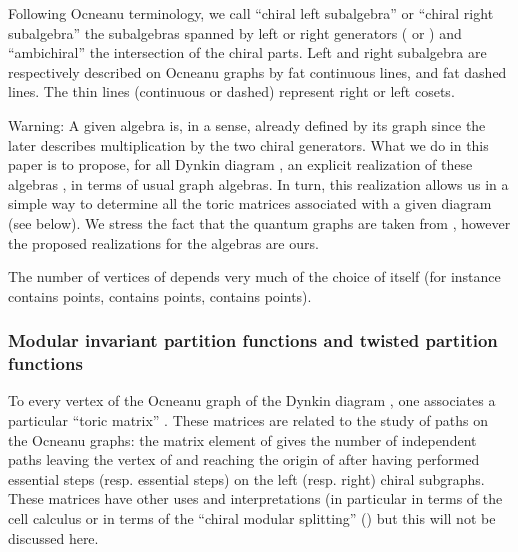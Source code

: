 \documentclass[a4paper,11pt]{article}
\def \otimesdot {\stackrel{\cdot}{\otimes}}
\begin{document}
Following Ocneanu terminology, we call ``chiral left subalgebra'' or ``chiral
right subalgebra'' the subalgebras spanned by left or right generators (\coordHE{} or \coordHE{})
       and ``ambichiral'' the intersection of the chiral parts. Left and
       right subalgebra are respectively described on Ocneanu graphs by
fat continuous lines,
       and fat dashed lines. The thin lines (continuous or dashed) represent
       right or left cosets.

       \smallskip

       Warning:  A given algebra  \coordHE{} is, in a
sense, already defined
       by its graph \coordHE{} since the later describes multiplication by
       the two chiral generators. What we do in this paper is to
propose, for all Dynkin diagram
       \coordHE{}, an explicit  realization of these algebras \coordHE{}, in terms of usual graph algebras. In turn,
       this realization allows us in a simple way to determine all the
toric matrices
       associated with a given diagram (see below).
         We stress the fact that the quantum graphs \coordHE{} are taken from
       \cite{Ocneanu:paths}, however the proposed realizations for the
       algebras \coordHE{} are ours.

       \smallskip
       
The number of vertices of
\coordHE{} depends very much of the choice of \coordHE{} itself (for instance
\coordHE{} contains \coordHE{}
points, \coordHE{} contains \coordHE{} points, \coordHE{} contains \coordHE{}
points).

\subsubsection{Modular invariant partition functions and twisted
partition functions}

To every vertex \coordHE{} of the Ocneanu graph \coordHE{} of the Dynkin diagram \coordHE{}, one
associates a particular ``toric matrix'' \coordHE{}. 
These matrices are related to the study of paths on the Ocneanu
graphs: the matrix element \coordHE{} of  \coordHE{} gives the 
number of independent  paths leaving the vertex \coordHE{} of 
\coordHE{} and reaching the origin \myHighlight{$0 \otimesdot 0$}\coordHE{} of \coordHE{} after 
having performed \coordHE{} essential steps 
(resp. \coordHE{} essential steps) on the left (resp. right) chiral subgraphs.
These matrices have other uses and interpretations 
(in particular in terms of the cell calculus or in terms of
the ``chiral modular splitting'' (\cite{Ocneanu:MSRI})
but this will not be discussed here.
\end{document}
